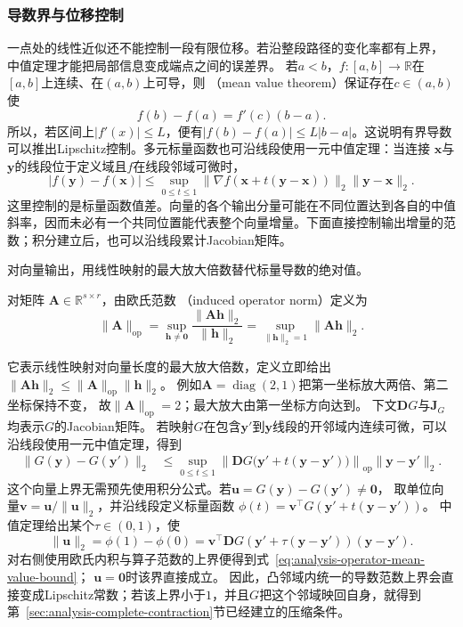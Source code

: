 \subsubsection{导数界与位移控制}

一点处的线性近似还不能控制一段有限位移。若沿整段路径的变化率都有上界，
中值定理才能把局部信息变成端点之间的误差界。
若$a<b$，$f:[a,b]\to\mathbb{R}$在$[a,b]$上连续、在$(a,b)$上可导，则
（mean value theorem）保证存在$c\in(a,b)$使
\begin{equation}
  f(b)-f(a)=f'(c)(b-a).
\label{eq:analysis-mean-value-theorem}
\end{equation}
所以，若区间上$|f'(x)|\leq L$，便有$|f(b)-f(a)|\leq L|b-a|$。这说明有界导数可以推出Lipschitz控制。多元标量函数也可沿线段使用一元中值定理：当连接 $\bm{x}$与$\bm{y}$的线段位于定义域且$f$在线段邻域可微时，
\[   |f(\bm{y})-f(\bm{x})|   \leq   \sup_{0\leq t\leq1}   \lVert\nabla f(\bm{x}+t(\bm{y}-\bm{x}))\rVert_2   \lVert\bm{y}-\bm{x}\rVert_2. \]
这里控制的是标量函数值差。向量的各个输出分量可能在不同位置达到各自的中值斜率，因而未必有一个共同位置能代表整个向量增量。下面直接控制输出增量的范数；积分建立后，也可以沿线段累计Jacobian矩阵。

对向量输出，用线性映射的最大放大倍数替代标量导数的绝对值。
\begin{definition}[欧氏诱导算子范数]
\label{def:analysis-induced-operator-norm}
对矩阵
$\bm{A}\in\mathbb{R}^{s\times r}$，由欧氏范数
（induced operator norm）定义为
\[
  \lVert\bm{A}\rVert_{\mathrm{op}}
  =
  \sup_{\bm{h}\neq\bm{0}}
  \frac{\lVert\bm{A}\bm{h}\rVert_2}{\lVert\bm{h}\rVert_2}
  =
  \sup_{\lVert\bm{h}\rVert_2=1}\lVert\bm{A}\bm{h}\rVert_2.
\]
\end{definition}
它表示线性映射对向量长度的最大放大倍数，定义立即给出
$\lVert\bm{A}\bm{h}\rVert_2
\leq\lVert\bm{A}\rVert_{\mathrm{op}}\lVert\bm{h}\rVert_2$。
例如$\bm A=\operatorname{diag}(2,1)$把第一坐标放大两倍、第二坐标保持不变，
故$\lVert\bm A\rVert_{\mathrm{op}}=2$；最大放大由第一坐标方向达到。
下文$\bm DG$与$\bm J_G$均表示$G$的Jacobian矩阵。
若映射$G$在包含$\bm{y}'$到$\bm{y}$线段的开邻域内连续可微，可以沿线段使用一元中值定理，得到
\begin{equation}
  \begin{aligned}
  \lVert G(\bm{y})-G(\bm{y}')\rVert_2
  &\leq
  \sup_{0\leq t\leq1}
  \left\lVert
    \bm{D}G\bigl(\bm{y}'+t(\bm{y}-\bm{y}')\bigr)
  \right\rVert_{\mathrm{op}}
  \lVert\bm{y}-\bm{y}'\rVert_2.
  \end{aligned}
\label{eq:analysis-operator-mean-value-bound}
\end{equation}
这个向量上界无需预先使用积分公式。若$\bm u=G(\bm y)-G(\bm y')\neq\bm0$，
取单位向量$\bm v=\bm u/\lVert\bm u\rVert_2$，并沿线段定义标量函数
$\phi(t)=\bm v^\top G(\bm y'+t(\bm y-\bm y'))$。
中值定理给出某个$\tau\in(0,1)$，使
\[
 \lVert\bm u\rVert_2
 =\phi(1)-\phi(0)
 =\bm v^\top\bm DG(\bm y'+\tau(\bm y-\bm y'))(\bm y-\bm y').
\]
对右侧使用欧氏内积与算子范数的上界便得到式~\eqref{eq:analysis-operator-mean-value-bound}；
$\bm u=\bm0$时该界直接成立。
因此，凸邻域内统一的导数范数上界会直接变成Lipschitz常数；若该上界小于$1$，并且$G$把这个邻域映回自身，就得到
第~\ref{sec:analysis-complete-contraction}节已经建立的压缩条件。

